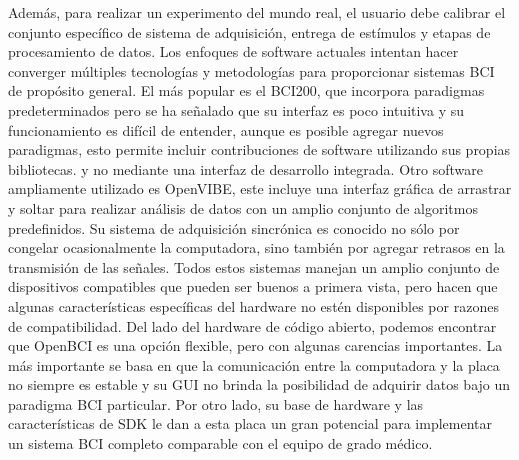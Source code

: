 Además, para realizar un experimento del mundo real, el usuario debe calibrar el conjunto específico de sistema de adquisición, entrega de estímulos y etapas de procesamiento de datos. Los enfoques de software actuales intentan hacer converger múltiples tecnologías y metodologías para proporcionar sistemas \gls*{BCI} de propósito general. El más popular es el BCI200, que incorpora paradigmas predeterminados pero se ha señalado que su interfaz es poco intuitiva y su funcionamiento es difícil de entender, aunque es posible agregar nuevos paradigmas, esto permite incluir contribuciones de software utilizando sus propias bibliotecas. y no mediante una interfaz de desarrollo integrada. Otro software ampliamente utilizado es OpenVIBE, este incluye una interfaz gráfica de arrastrar y soltar para realizar análisis de datos con un amplio conjunto de algoritmos predefinidos. Su sistema de adquisición sincrónica es conocido no sólo por congelar ocasionalmente la computadora, sino también por agregar retrasos en la transmisión de las señales. Todos estos sistemas manejan un amplio conjunto de dispositivos compatibles que pueden ser buenos a primera vista, pero hacen que algunas características específicas del hardware no estén disponibles por razones de compatibilidad. Del lado del hardware de código abierto, podemos encontrar que OpenBCI es una opción flexible, pero con algunas carencias importantes. La más importante se basa en que la comunicación entre la computadora y la placa no siempre es estable y su \gls*{GUI} no brinda la posibilidad de adquirir datos bajo un paradigma \gls*{BCI} particular. Por otro lado, su base de hardware y las características de \gls*{SDK} le dan a esta placa un gran potencial para implementar un sistema \gls*{BCI} completo comparable con el equipo de grado médico.\\




